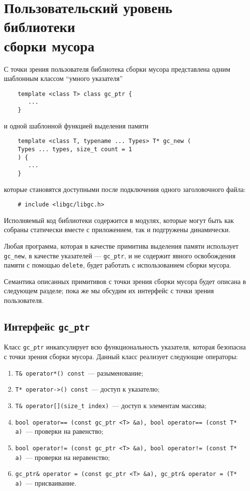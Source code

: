 \section {Пользовательский уровень библиотеки\\
сборки мусора}

С точки зрения пользователя библиотека сборки мусора представлена одним шаблонным классом
``умного указателя'' 

\begin{lstlisting}
    template <class T> class gc_ptr {
       ...
    }
\end{lstlisting}

и одной шаблонной функцией выделения памяти

\begin{lstlisting}
    template <class T, typename ... Types> T* gc_new (
    Types ... types, size_t count = 1
    ) {
       ...
    }
\end{lstlisting}

которые становятся доступными после подключения одного заголовочного файла:

\begin{lstlisting}
    # include <libgc/libgc.h>
\end{lstlisting}

Исполняемый код библиотеки содержится в модулях, которые могут быть как собраны статически вместе
с приложением, так и подгружены динамически.

Любая программа, которая в качестве примитива выделения памяти использует \lstinline{gc_new}, в качестве
указателей --- \lstinline{gc_ptr}, и не содержит явного освобождения памяти с помощью \lstinline{delete}, будет
работать с использованием сборки мусора.

Семантика описанных примитивов с точки зрения сборки мусора будет описана в следующем разделе; пока же
мы обсудим их интерфейс с точки зрения пользователя.

\subsection{Интерфейс \lstinline{gc_ptr}}

Класс \lstinline{gc_ptr} инкапсулирует всю функциональность указателя, которая безопасна с точки зрения
сборки мусора. Данный класс реализует следующие операторы:

\begin{enumerate}
\item \lstinline{T& operator*() const}~--- разыменование;
\item \lstinline{T* operator->() const}~--- доступ к указателю;
\item \lstinline{T& operator[](size_t index)}~--- доступ к элементам массива;
\item \lstinline{bool operator== (const gc_ptr <T> &a), bool operator== (const T* a)}~--- проверки на равенство;
\item \lstinline{bool operator!= (const gc_ptr <T> &a), bool operator!= (const T* a)}~--- проверки на неравенство;
\item \lstinline{gc_ptr& operator = (const gc_ptr <T> &a), gc_ptr& operator = (T* a)}~--- присваивание.
\end{enumerate}

